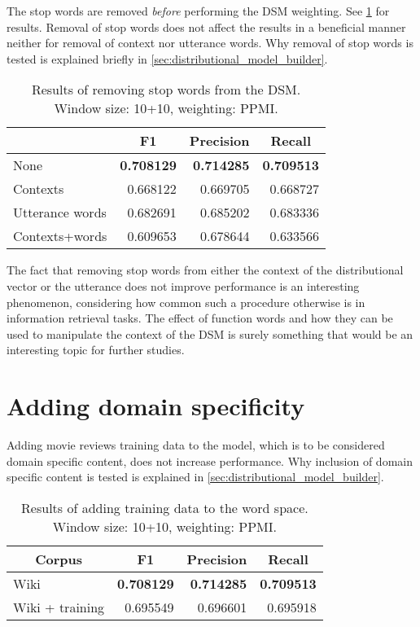 The stop words are removed \emph{before} performing the DSM weighting. See \cref{tbl:results-stopwords} for results. Removal of stop words does not affect the results in a beneficial manner neither for removal of context nor utterance words. Why removal of stop words is tested is explained briefly in \cref{sec:distributional_model_builder}.

\begin{table}[H]
\centering
\begin{tabular}{lrrr}
\toprule
  & \multicolumn{1}{c}{F1} & \multicolumn{1}{c}{Precision}
 & \multicolumn{1}{c}{Recall} \\
 \midrule
None            & \textbf{0.708129} & \textbf{0.714285} & \textbf{0.709513} \\
Contexts        & 0.668122          & 0.669705          & 0.668727          \\
Utterance words & 0.682691          & 0.685202          & 0.683336          \\
Contexts+words  & 0.609653          & 0.678644          & 0.633566          \\
\hline
\end{tabular}
    \caption{Results of removing stop words from the DSM. Window size: 10+10, weighting: PPMI.}
    \label{tbl:results-stopwords}
\end{table}

The fact that removing stop words from either the context of the distributional vector or the utterance does not improve performance is an interesting phenomenon, considering how common such a procedure otherwise is in information retrieval tasks. The effect of function words and how they can be used to manipulate the context of the DSM is surely something that would be an interesting topic for further studies.


\section{Adding domain specificity}\label{adding-domain-specific-context}

Adding movie reviews training data to the model, which is to be considered domain specific content, does not increase performance. Why inclusion of domain specific content is tested is explained in \cref{sec:distributional_model_builder}.

\begin{table}[H]
\centering
\begin{tabular}{lrrr}
\toprule
 \multicolumn{1}{c}{Corpus} & \multicolumn{1}{c}{F1} & \multicolumn{1}{c}{Precision}
 & \multicolumn{1}{c}{Recall} \\
 \midrule
Wiki            & \textbf{0.708129} & \textbf{0.714285} & \textbf{0.709513} \\
Wiki + training & 0.695549          & 0.696601          & 0.695918          \\
\hline
\end{tabular}
    \caption{Results of adding training data to the word space. Window size: 10+10, weighting: PPMI.}
    \label{tbl:results-domain}
\end{table}



